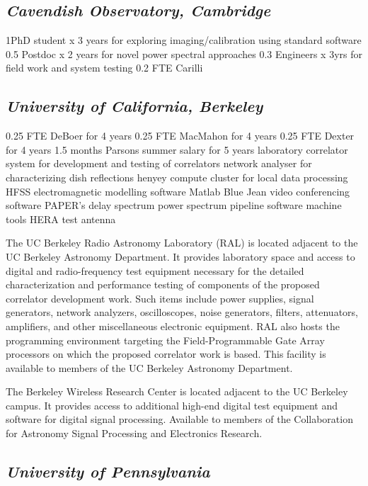 \documentclass[11pt]{article}
\begin{document}
\subsection*{\it Cavendish Observatory, Cambridge}

1PhD student x 3 years  for exploring imaging/calibration using standard software
0.5 Postdoc x 2 years for novel power spectral approaches
0.3 Engineers x 3yrs for field work and system testing
0.2 FTE Carilli

\subsection*{\it University of California, Berkeley}

0.25 FTE DeBoer for 4 years
0.25 FTE MacMahon for 4 years
0.25 FTE Dexter for 4 years
1.5 months Parsons summer salary for 5 years
laboratory correlator system for development and testing of correlators
network analyser for characterizing dish reflections
henyey compute cluster for local data processing
HFSS electromagnetic modelling software
Matlab
Blue Jean video conferencing software
PAPER's delay spectrum power spectrum pipeline software
machine tools
HERA test antenna


The UC Berkeley Radio Astronomy Laboratory (RAL) is located adjacent to the UC
Berkeley Astronomy Department. It provides laboratory space and access to
digital and radio-frequency test equipment necessary for the detailed
characterization and performance testing of components of the proposed correlator
development work. Such items include power supplies, signal generators, network
analyzers, oscilloscopes, noise generators, filters, attenuators, amplifiers,
and other miscellaneous electronic equipment. RAL also hosts the programming
environment targeting the Field-Programmable Gate Array processors on which the
proposed correlator work is based. This facility is available to members of the
UC Berkeley Astronomy Department.

The Berkeley Wireless Research Center is located adjacent to the UC Berkeley
campus. It provides access to additional high-end digital test equipment and
software for digital signal processing.  Available to members of the
Collaboration for Astronomy Signal Processing and Electronics Research.

\subsection*{\it University of Pennsylvania}
\end{document}
